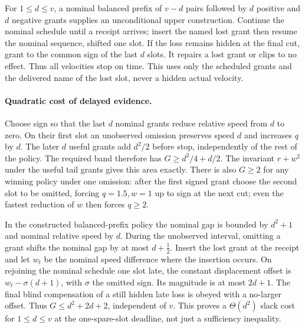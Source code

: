 \documentclass{article}
\begin{document}
For \(1\le d\le v\), a nominal balanced prefix of
\(v-d\) pairs followed by \(d\) positive and \(d\)
negative grants supplies an unconditional upper
construction. Continue the nominal schedule until a receipt
arrives; insert the named lost grant then resume the nominal
sequence, shifted one slot. If the loss remains hidden
at the final cut, grant to the common sign of the last
\(d\) slots. It repairs a lost grant or clips to no effect.
Thus all velocities stop on time. This uses only the scheduled
grants and the delivered name of the lost slot, never a hidden
actual velocity.

\paragraph{Quadratic cost of delayed evidence.}
Choose sign so that the last \(d\) nominal grants reduce
relative speed from \(d\) to zero. On their first slot an
unobserved omission preserves speed \(d\) and increases
\(q\) by \(d\). The later \(d\) useful grants add \(d^2/2\)
before stop, independently of the rest of the policy.
The required band therefore has
\(G\ge d^2/4+d/2\).
The invariant \(r+w^2\) under the useful tail grants
gives this area exactly. There is also \(G\ge2\)
for any winning policy under one omission: after the
first signed grant choose the second slot to be omitted,
forcing \(q=1.5,w=1\) up to sign at the next cut; even
the fastest reduction of \(w\) then forces \(q\ge2\).

In the constructed balanced-prefix policy the nominal
gap is bounded by \(d^2+1\) and nominal relative
speed by \(d\). During the unobserved interval, omitting a
grant shifts the nominal gap by at most \(d+\tfrac12\).
Insert the lost grant at the receipt and let \(w_t\)
be the nominal speed difference where the insertion occurs.
On rejoining the nominal schedule one slot late, the
constant displacement offset is
\(w_t-\sigma(d+1)\), with \(\sigma\) the omitted sign.
Its magnitude is at most \(2d+1\). The final blind
compensation of a still hidden late loss is obeyed with
a no-larger offset. Thus \(G\le d^2+2d+2\), independent
of \(v\). This proves a \(\Theta(d^2)\) slack cost for
\(1\le d\le v\) at the one-spare-slot deadline, not just
a sufficiency inequality.
\end{document}
